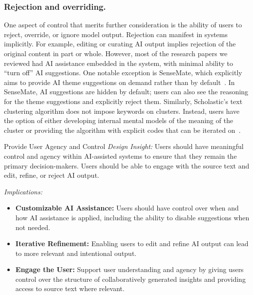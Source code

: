 
\subsubsection{Rejection and overriding.} One aspect of control that merits further consideration is the ability of users to reject, override, or ignore model output. Rejection can manifest in systems implicitly. For example, editing or curating AI output implies rejection of the original content in part or whole. However, most of the research papers we reviewed had AI assistance embedded in the system, with minimal ability to ``turn off'' AI suggestions. One notable exception is SenseMate, which explicitly aims to provide AI theme suggestions on demand rather than by default~\cite{sensemate}. In SenseMate, AI suggestions are hidden by default; users can also see the reasoning for the theme suggestions and explicitly reject them. Similarly, Scholastic's text clustering algorithm does not impose keywords on clusters. Instead, users have the option of either developing internal mental models of the meaning of the cluster or providing the algorithm with explicit codes that can be iterated on~\cite{scholastic}.

\begin{designRecom}{Provide User Agency and Control}
\textit{Design Insight:} Users should have meaningful control and agency within AI-assisted systems to ensure that they remain the primary decision-makers. Users should be able to engage with the source text and edit, refine, or reject AI output.
\smallskip

\textit{Implications:} 
\begin{itemize} 
\item \textbf{Customizable AI Assistance:} Users should have control over when and how AI assistance is applied, including the ability to disable suggestions when not needed.
\item \textbf{Iterative Refinement:} Enabling users to edit and refine AI output can lead to more relevant and intentional output.
\item \textbf{Engage the User:} Support user understanding and agency by giving users control over the structure of collaboratively generated insights and providing access to source text where relevant.
\end{itemize}

\end{designRecom}

